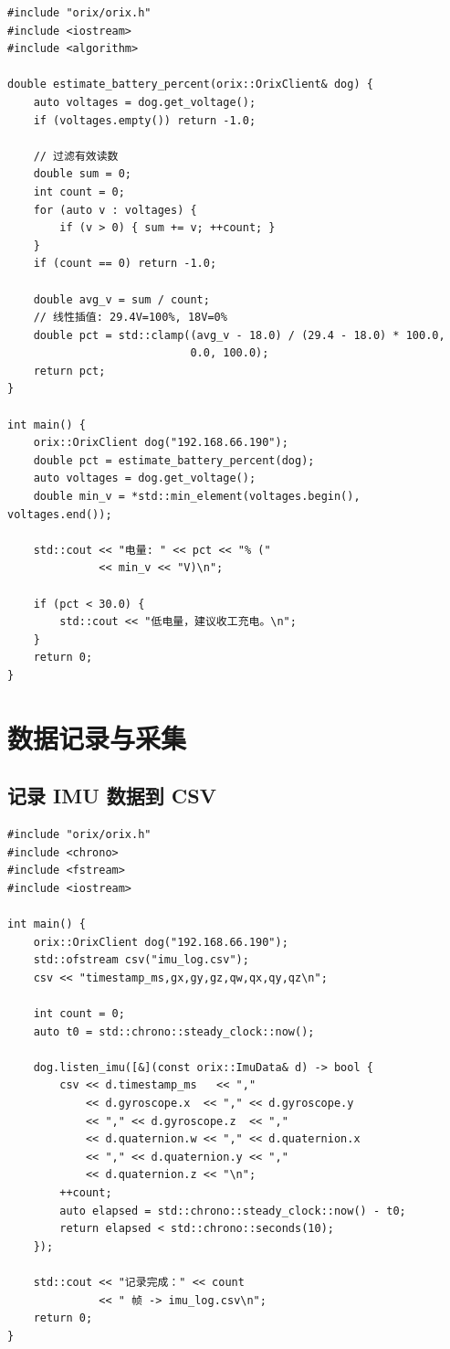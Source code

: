 \documentclass[a4paper,11pt,openany]{book}
\begin{document}
\begin{lstlisting}[style=cpp]
#include "orix/orix.h"
#include <iostream>
#include <algorithm>

double estimate_battery_percent(orix::OrixClient& dog) {
    auto voltages = dog.get_voltage();
    if (voltages.empty()) return -1.0;

    // 过滤有效读数
    double sum = 0;
    int count = 0;
    for (auto v : voltages) {
        if (v > 0) { sum += v; ++count; }
    }
    if (count == 0) return -1.0;

    double avg_v = sum / count;
    // 线性插值: 29.4V=100%, 18V=0%
    double pct = std::clamp((avg_v - 18.0) / (29.4 - 18.0) * 100.0,
                            0.0, 100.0);
    return pct;
}

int main() {
    orix::OrixClient dog("192.168.66.190");
    double pct = estimate_battery_percent(dog);
    auto voltages = dog.get_voltage();
    double min_v = *std::min_element(voltages.begin(), voltages.end());

    std::cout << "电量: " << pct << "% ("
              << min_v << "V)\n";

    if (pct < 30.0) {
        std::cout << "低电量，建议收工充电。\n";
    }
    return 0;
}
\end{lstlisting}

\section{数据记录与采集}

\subsection{记录 IMU 数据到 CSV}

\begin{lstlisting}[style=cpp]
#include "orix/orix.h"
#include <chrono>
#include <fstream>
#include <iostream>

int main() {
    orix::OrixClient dog("192.168.66.190");
    std::ofstream csv("imu_log.csv");
    csv << "timestamp_ms,gx,gy,gz,qw,qx,qy,qz\n";

    int count = 0;
    auto t0 = std::chrono::steady_clock::now();

    dog.listen_imu([&](const orix::ImuData& d) -> bool {
        csv << d.timestamp_ms   << ","
            << d.gyroscope.x  << "," << d.gyroscope.y
            << "," << d.gyroscope.z  << ","
            << d.quaternion.w << "," << d.quaternion.x
            << "," << d.quaternion.y << ","
            << d.quaternion.z << "\n";
        ++count;
        auto elapsed = std::chrono::steady_clock::now() - t0;
        return elapsed < std::chrono::seconds(10);
    });

    std::cout << "记录完成：" << count
              << " 帧 -> imu_log.csv\n";
    return 0;
}
\end{lstlisting}
\end{document}

